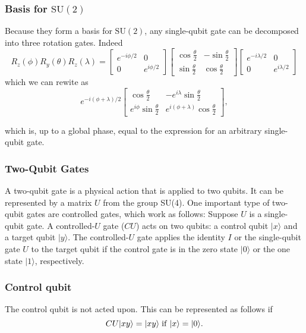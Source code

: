 \documentclass{beamer}
\begin{document}
\begin{frame}
\frametitle{Basis for $\mathrm{SU}(2)$}

Because they form a basis for $\mathrm{SU}(2)$, any single-qubit gate
can be decomposed into three rotation gates. Indeed
\[
R_z(\phi)R_y(\theta)R_z(\lambda)=
\begin{bmatrix}
e^{-i\phi/2} & 0 \\
0 & e^{i\phi/2}
\end{bmatrix}
\begin{bmatrix}
\cos\frac{\theta}{2} & -\sin\frac{\theta}{2} \\
\sin\frac{\theta}{2} & \cos\frac{\theta}{2} 
\end{bmatrix}
\begin{bmatrix}
e^{-i\lambda/2} & 0 \\
0 & e^{i\lambda/2}
\end{bmatrix}
\]
which we can rewite as
\[
e^{-i(\phi+\lambda)/2}
\begin{bmatrix}
\cos\frac{\theta}{2} & -e^{i\lambda}\sin\frac{\theta}{2}\\
e^{i\phi}\sin\frac{\theta}{2} & e^{i(\phi+\lambda)}\cos\frac{\theta}{2}
\end{bmatrix},
\]

which is, up to a global phase, equal to the expression for an arbitrary single-qubit gate.
\end{frame}

\begin{frame}
\frametitle{Two-Qubit Gates}

A two-qubit gate is a physical action that is applied to two
qubits. It can be represented by a matrix $U$ from the group
SU(4). One important type of two-qubit gates are controlled gates,
which work as follows: Suppose $U$ is a single-qubit gate. A
controlled-$U$ gate ($CU$) acts on two qubits: a control qubit
$\vert x \rangle $ and a target qubit $\vert y \rangle $. The controlled-$U$ gate
applies the identity $I$ or the single-qubit gate $U$ to the target
qubit if the control gate is in the zero state $\vert 0\rangle$ or the one
state $\vert 1\rangle$, respectively.
\end{frame}

\begin{frame}
\frametitle{Control qubit}

The control qubit is not acted
upon. This can be represented as follows if
\[CU\vert xy\rangle=
\vert xy\rangle \hspace{0.1cm} \mathrm{if} \hspace{0.1cm}  \vert x \rangle =\vert 0\rangle.
\]
\end{frame}
\end{document}
